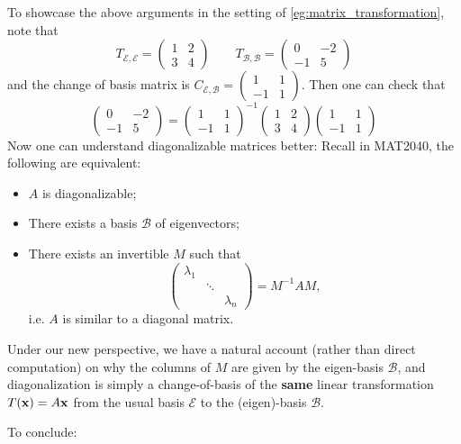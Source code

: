 To showcase the above arguments in the setting of  \autoref{eg:matrix_transformation}, note that
$$T_{\mathcal{E},\mathcal{E}} = \begin{pmatrix}
        1 & 2 \\ 3 & 4
    \end{pmatrix} \quad \quad T_{\mathcal{B},\mathcal{B}} = \begin{pmatrix}
        0 & -2 \\ -1 & 5
    \end{pmatrix}$$
and the change of basis matrix is
$C_{\mathcal{E},\mathcal{B}} = \begin{pmatrix}
        1 & 1 \\ -1 & 1
    \end{pmatrix}$. Then one can check that
$$\begin{pmatrix}
        0 & -2 \\ -1 & 5
    \end{pmatrix} = \begin{pmatrix}
        1 & 1 \\ -1 & 1
    \end{pmatrix}^{-1}\begin{pmatrix}
        1 & 2 \\ 3 & 4
    \end{pmatrix}\begin{pmatrix}
        1 & 1 \\ -1 & 1
    \end{pmatrix}$$
Now one can understand diagonalizable matrices better: Recall in MAT2040, the following are equivalent:
\begin{itemize}
    \item $A$ is diagonalizable;
    \item There exists a basis $\mathcal{B}$ of eigenvectors;
    \item There exists an invertible $M$ such that
    $$\begin{pmatrix}
        \lambda_1 & & \\
        & \ddots & \\
        & & \lambda_n
    \end{pmatrix} = M^{-1}AM,$$
    i.e. $A$ is similar to a diagonal matrix.
\end{itemize}
Under our new perspective, we have a natural account (rather than direct computation) on why the columns of $M$ are given by the eigen-basis $\mathcal{B}$, and diagonalization is simply a change-of-basis of the {\bf same} linear transformation $T({\bf x}) = A{\bf x}$ from the usual basis $\mathcal{E}$ to the (eigen)-basis $\mathcal{B}$.

To conclude:
\begin{center}
\end{center}


